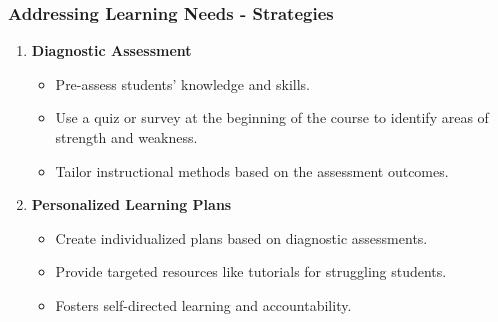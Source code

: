 \documentclass[aspectratio=169]{beamer}
\begin{document}
\begin{frame}[fragile]
    \frametitle{Addressing Learning Needs - Strategies}
    \begin{enumerate}
        \item \textbf{Diagnostic Assessment}
            \begin{itemize}
                \item Pre-assess students' knowledge and skills.
                \item Use a quiz or survey at the beginning of the course to identify areas of strength and weakness.
                \item Tailor instructional methods based on the assessment outcomes.
            \end{itemize}
        
        \item \textbf{Personalized Learning Plans}
            \begin{itemize}
                \item Create individualized plans based on diagnostic assessments.
                \item Provide targeted resources like tutorials for struggling students.
                \item Fosters self-directed learning and accountability.
            \end{itemize}
    \end{enumerate}
\end{frame}
\end{document}
